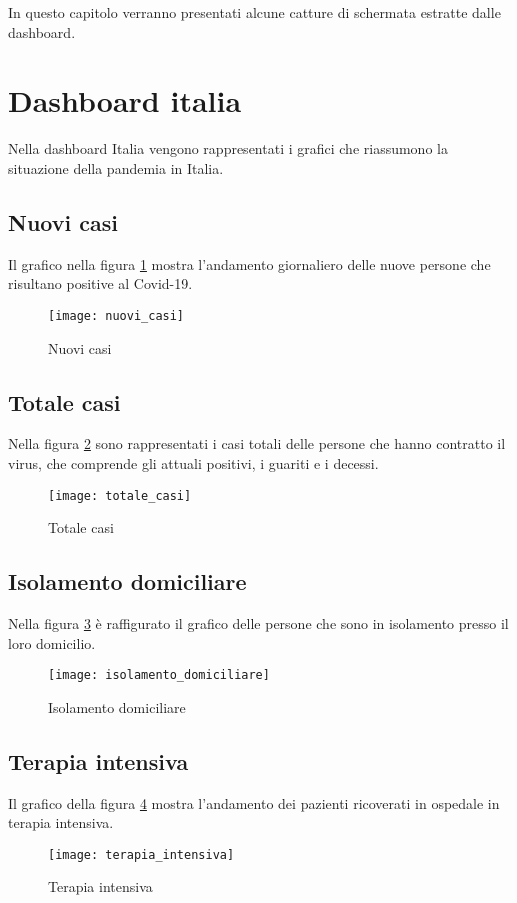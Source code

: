 
\noindent In questo capitolo verranno presentati alcune catture di schermata estratte dalle dashboard.

\section{Dashboard italia}
Nella dashboard Italia vengono rappresentati i grafici che riassumono la situazione della pandemia in Italia.

\subsection{Nuovi casi}
Il grafico nella figura \ref{fig:nuovi_casi} mostra l'andamento giornaliero delle nuove persone che risultano positive al Covid-19.
\begin{figure}[htp]
    \centering
    \texttt{[image: nuovi\_casi]}
    \caption{Nuovi casi}
    \label{fig:nuovi_casi}
\end{figure}

\subsection{Totale casi}
Nella figura \ref{fig:totale_casi} sono rappresentati i casi totali delle persone che hanno contratto il virus, che comprende gli attuali positivi, i guariti e i decessi.
\begin{figure}[htp]
    \centering
    \texttt{[image: totale\_casi]}
    \caption{Totale casi}
    \label{fig:totale_casi}
\end{figure}

\subsection{Isolamento domiciliare}
Nella figura \ref{fig:isolamento_domiciliare} è raffigurato il grafico delle persone che sono in isolamento presso il loro domicilio.
\begin{figure}[htp]
    \centering
    \texttt{[image: isolamento\_domiciliare]}
    \caption{Isolamento domiciliare}
    \label{fig:isolamento_domiciliare}
\end{figure}

\subsection{Terapia intensiva}
Il grafico della figura \ref{fig:terapia_intensiva} mostra l'andamento dei pazienti ricoverati in ospedale in terapia intensiva.
\begin{figure}[htp]
    \centering
    \texttt{[image: terapia\_intensiva]}
    \caption{Terapia intensiva}
    \label{fig:terapia_intensiva}
\end{figure}

